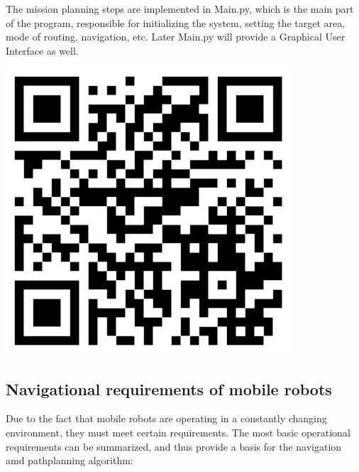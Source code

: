\begin{tcolorbox}[colback=cyan!5,colframe=cyan!40!black,title=Code: Main.py \\ https://www.dropbox.com/s/h1067ywmdajkegk/Main.py]
\begin{minipage}{0,6\textwidth}
The mission planning steps are implemented in Main.py, which is the main part of the program, responsible for initializing the system, setting the target area, mode of routing, navigation, etc. Later Main.py will provide a Graphical User Interface as well.
\end{minipage}
\begin{minipage}{0,35\textwidth}
\raggedleft
\includegraphics[width=0.8\textwidth]{img/main}
\end{minipage}

\end{tcolorbox}

\subsection{Navigational requirements of mobile robots}

Due to the fact that mobile robots are operating in a constantly changing environment, they must meet certain requirements. The most basic operational requirements can be summarized\cite{navreq}, and thus provide a basis for the navigation amd pathplanning algorithm:

